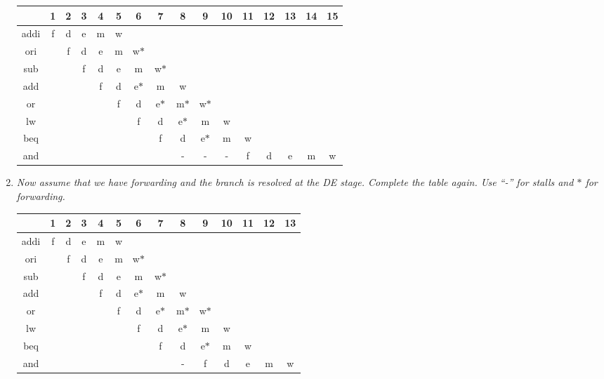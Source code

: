 \documentclass{article}
\begin{document}
\begin{enumerate}[label=(\alph*)]
        \begin{table}[ht]
            \centering
            \begin{tabular}{|c|c|c|c|c|c|c|c|c|c|c|c|c|c|c|c|}
                \hline
                & 1 & 2 & 3 & 4 & 5 & 6 & 7 & 8 & 9 & 10 & 11 & 12 & 13 & 14 & 15 \\
                \hline
                addi & f & d & e & m & w & & & & & & & & & & \\
                \hline
                ori & & f & d & e & m & w$*$ & & & & & & & & & \\
                \hline
                sub & & & f & d & e & m & w$*$ & & & & & & & & \\
                \hline
                add & & & & f & d & e$*$ & m & w & & & & & & & \\
                \hline
                or & & & & & f & d & e$*$ & m$*$ & w$*$ & & & & & & \\
                \hline
                lw & & & & & & f & d & e$*$ & m & w & & & & & \\
                \hline
                beq & & & & & & & f & d & e$*$ & m & w & & & & \\
                \hline
                and & & & & & & & & - & - & - & f & d & e & m & w \\
                \hline
            \end{tabular}
        \end{table}


    \item \textit{Now assume that we have forwarding and the branch is resolved at the DE stage. 
        Complete the table again. Use ``-'' for stalls and $*$ for forwarding.}

        \begin{table}[ht]
            \centering
            \begin{tabular}{|c|c|c|c|c|c|c|c|c|c|c|c|c|c|}
                \hline
                & 1 & 2 & 3 & 4 & 5 & 6 & 7 & 8 & 9 & 10 & 11 & 12 & 13 \\
                \hline
                addi & f & d & e & m & w & & & & & & & & \\
                \hline
                ori & & f & d & e & m & w$*$ & & & & & & & \\
                \hline
                sub & & & f & d & e & m & w$*$ & & & & & & \\
                \hline
                add & & & & f & d & e$*$ & m & w & & & & & \\
                \hline
                or & & & & & f & d & e$*$ & m$*$ & w$*$ & & & & \\
                \hline
                lw & & & & & & f & d & e$*$ & m & w & & & \\
                \hline
                beq & & & & & & & f & d & e$*$ & m & w & & \\
                \hline
                and & & & & & & & & - & f & d & e & m & w \\
                \hline
            \end{tabular}
        \end{table}



\end{enumerate}
\end{document}
